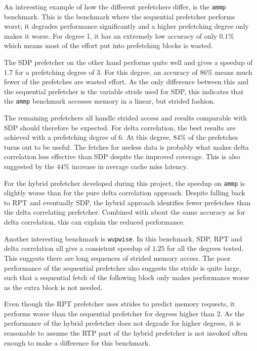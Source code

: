 An interesting example of how the different prefetchers differ, is the
\texttt{ammp} benchmark.   This is the benchmark where the sequential prefetcher performs worst; it
degrades performance significantly and a higher prefetching degree only makes
it worse.  For degree 1, it has an extremely low accuracy of only $0.1\%$ which
means most of the effort put into prefetching blocks is wasted.

The SDP prefetcher on the other hand performs quite well and gives a speedup of
$1.7$ for a prefetching degree of $3$. For this degree, an accuracy of $86\%$
means much fewer of the prefetches are wasted effort.  As the only difference
between this and the sequential prefetcher is the variable stride used for SDP,
this indicates that the \texttt{ammp} benchmark accesses memory in a linear,
but strided fashion.  

The remaining prefetchers all handle strided access and results comparable with
SDP should therefore be expected.  For delta correlation, the best results are
achieved with a prefetching degree of $6$.  At this degree, $84\%$ of the
prefetches turns out to be useful.  The fetches for useless data is probably
what makes delta correlation less effective than SDP despite the improved
coverage.
This is also suggested by the $44\%$ increase in average cache miss latency.

For the hybrid prefetcher developed during this project, the speedup on \texttt{ammp} is slightly
worse than for the pure delta correlation approach.
Despite falling back to RPT and eventually SDP, the hybrid approach identifies
fewer prefetches than the delta correlating prefetcher.
Combined with about the same accuracy as for delta correlation, this can explain
the reduced performance.

Another interesting benchmark is \texttt{wupwise}.
In this benchmark, SDP, RPT and delta correlation all give a consistent speedup
of $1.25$ for all the degrees tested.
This suggests there are long sequences of strided memory access.
The poor performance of the sequential prefetcher also suggests the stride is
quite large, such that a sequential fetch of the following block only makes
performance worse as the extra block is not needed.

Even though the RPT prefetcher uses strides to predict memory requests, it
performs worse than the sequential prefetcher for degrees higher than 2.
As the performance of the hybrid prefetcher does not degrade for higher degrees,
it is reasonable to assume the RTP part of the hybrid prefetcher is not invoked
often enough to make a difference for this benchmark.

